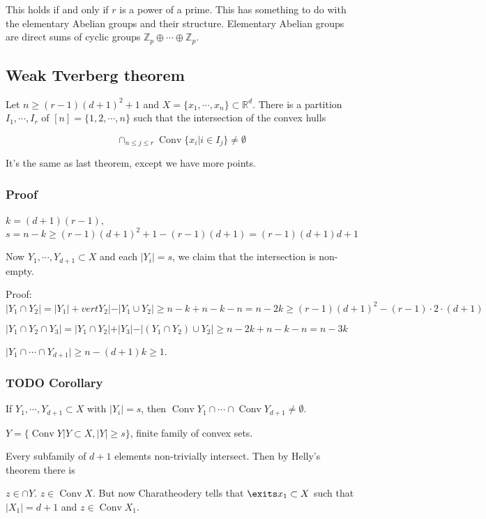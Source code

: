 \documentclass[11pt]{article}
\def\R{\mathbb{R}}
\def\Z{\mathbb{Z}}
\def\conv{\operatorname{Conv}}
\begin{document}
This holds if and only if \(r\) is a power of a prime. This has something to
do with the elementary Abelian groups and their structure. Elementary
Abelian groups are direct sums of cyclic groups \(\Z_p \oplus \cdots \oplus
    \Z_p\).
\subsection{Weak Tverberg theorem}
\label{sec:orgd285711}
Let \(n\ge (r-1)(d+1)^2 + 1\) and \(X = \{x_1, \cdots, x_n\} \subset \R^d\).
There is a partition \(I_1, \cdots, I_r\) of \([n] = \{1, 2, \cdots, n\}\) such
that the intersection of the convex hulls 

$$\cap_{n \le j \le r} \conv\{x_i \vert i \in I_j\} \neq \emptyset$$

It's the same as last theorem, except we have more points.
\subsubsection{Proof}
\label{sec:org527ad00}
\(k=(d+1)(r-1)\), \(s=n-k \ge (r-1)(d+1)^2 + 1 - (r-1)(d+1) = (r-1)(d+1)d +1\)

Now \(Y_1, \cdots, Y_{d+1} \subset X\) and each \(\vert Y_i\vert = s\), we claim
that the intersection is non-empty.

Proof: \(\vert Y_1 \cap Y_2\vert = \vert Y_1\vert + vert Y_2\vert - \vert Y_1
    \cup Y_2 \vert \ge n-k+n-k-n = n-2k \ge (r-1)(d+1)^2 - (r-1)\cdot 2 \cdot
    (d+1)\)

\(\vert Y_1 \cap Y_2 \cap Y_3 \vert = \vert Y_1 \cap Y_2 \vert + \vert
    Y_3\vert - \vert (Y_1 \cap Y_2) \cup Y_2\vert \ge n-2k+n-k-n = n-3k\)

\(\vert Y_1 \cap \cdots \cap Y_{d+1} \vert \ge n - (d+1)k \ge 1\).
\subsubsection{{\bfseries\sffamily TODO} Corollary}
\label{sec:org74b08f9}
If \(Y_1, \cdots, Y_{d+1} \subset X\) with \(\vert Y_i\vert = s\), then \(\conv
    Y_1 \cap \cdots \cap \conv Y_{d+1} \neq \emptyset\).

\(Y=\{\conv Y\vert Y \subset X, \vert Y\vert \ge s\}\), finite family of
convex sets.

Every subfamily of \(d+1\) elements non-trivially intersect. Then by Helly's
theorem there is

\(z \in \cap Y\). \(z\in \conv X\). But now Charatheodery tells that \(\exits x_1
    \subset X\) such that \(\vert X_1 \vert = d+1\) and \(z \in \conv X_1\).
\end{document}
